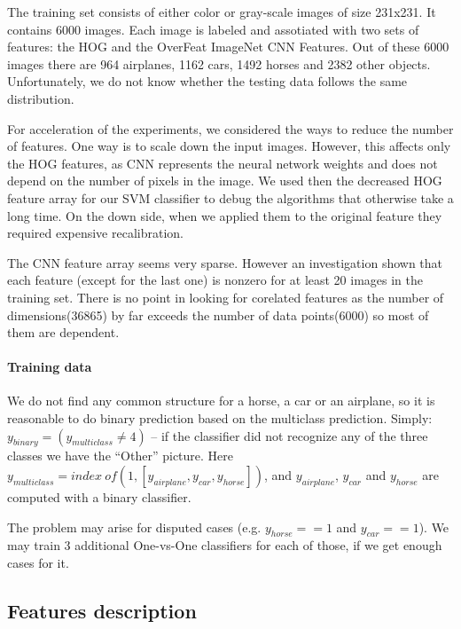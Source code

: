 \documentclass{article} %
\begin{document}
The training set consists of either color or gray-scale images of size 231x231. It contains 6000 images. Each image is labeled and assotiated with two sets of features: the HOG and the OverFeat ImageNet CNN Features.
Out of these 6000 images there are 964 airplanes, 1162 cars, 1492 horses and 2382 other objects.
Unfortunately, we do not know whether the testing data follows the same distribution.

For acceleration of the experiments, we considered the ways to reduce the number of features. 
One way is to scale down the input images. However, this affects only the HOG features, as CNN represents the neural network weights and does not depend on the number of pixels in the image. We used then the decreased HOG feature array for our SVM classifier to debug the algorithms that otherwise take a long time. On the down side, when we applied them to the original feature they required expensive recalibration.

The CNN feature array seems very sparse. However an investigation shown that each feature (except for the last one) is nonzero for at least 20 images in the training set. There is no point in looking for corelated features as the number of dimensions(36865) by far exceeds the number of data points(6000) so most of them are dependent.

\paragraph{Training data}

We do not find any common structure for a horse, a car or an airplane, so it is reasonable to do binary prediction based on the multiclass prediction. Simply:
$y_{binary} = (y_{multiclass} \neq 4)$  -- if the classifier did not recognize any of the three classes we have the ``Other'' picture. Here $y_{multiclass} = index\ of(1, [y_{airplane}, y_{car}, y_{horse}])$, and $y_{airplane}$, $y_{car}$ and $y_{horse}$ are computed with a binary classifier.

The problem may arise for disputed cases (e.g. $y_{horse} == 1$ and $y_{car} == 1$). We may train 3 additional One-vs-One classifiers for each of those, if we get enough cases for it.

\subsection{Features description}
\end{document}
